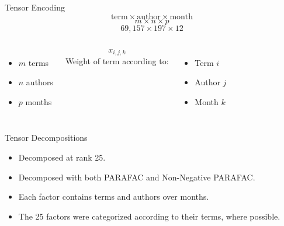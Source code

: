 \documentclass[handout]{beamer}
\begin{document}
\begin{frame}{Tensor Encoding}
    \[
    \mathrm{term} \times \mathrm{author} \times \mathrm{month}
    \]
    \[
        m \times n \times p
    \]
    \[
    69,157 \times 197 \times 12
    \]
    \begin{columns}
    \begin{itemize}
        \item $m$ terms
        \item $n$ authors
        \item $p$ months
    \end{itemize}
    \[
        x_{i,j,k}
    \]
    Weight of term according to:
    \begin{itemize}
        \item Term $i$ 
        \item Author $j$
        \item Month $k$
    \end{itemize}
    \end{columns}
\end{frame}

\begin{frame}{Tensor Decompositions}
    \begin{itemize}
        \item Decomposed at rank 25.
        \item Decomposed with both PARAFAC and Non-Negative PARAFAC.
        \item Each factor contains terms and authors over months.
        \item The 25 factors were categorized according to their terms, where possible.
    \end{itemize}
\end{frame}
\end{document}
